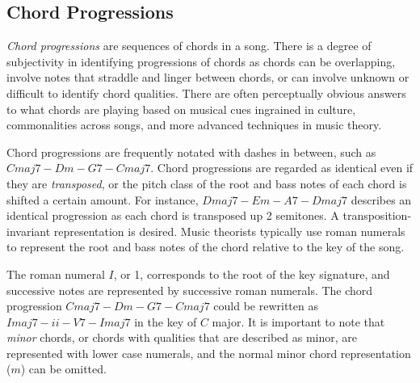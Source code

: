 \subsection{Chord Progressions}

\textit{Chord progressions} are sequences of chords in a song. There is a degree of subjectivity in identifying progressions of chords as chords can be overlapping, involve notes that straddle and linger between chords, or can involve unknown or difficult to identify chord qualities. There are often perceptually obvious answers to what chords are playing based on musical cues ingrained in culture, commonalities across songs, and more advanced techniques in music theory.

Chord progressions are frequently notated with dashes in between, such as $Cmaj7 - Dm - G7 - Cmaj7$. Chord progressions are regarded as identical even if they are \textit{transposed}, or the pitch class of the root and bass notes of each chord is shifted a certain amount. For instance, $Dmaj7 - Em - A7 - Dmaj7$ describes an identical progression as each chord is transposed up 2 semitones. A transposition-invariant representation is desired. Music theorists typically use roman numerals to represent the root and bass notes of the chord relative to the key of the song.

The roman numeral $I$, or 1, corresponds to the root of the key signature, and successive notes are represented by successive roman numerals. The chord progression $Cmaj7 - Dm - G7 - Cmaj7$ could be rewritten as $Imaj7 - ii - V7 - Imaj7$ in the key of $C$ major. It is important to note that \textit{minor} chords, or chords with qualities that are described as minor, are represented with lower case numerals, and the normal minor chord representation ($m$) can be omitted.